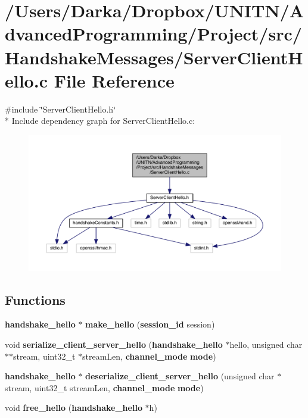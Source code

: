 \section{/\+Users/\+Darka/\+Dropbox/\+U\+N\+I\+T\+N/\+Advanced\+Programming/\+Project/src/\+Handshake\+Messages/\+Server\+Client\+Hello.c File Reference}
\label{_server_client_hello_8c}
{\ttfamily \#include \char`\"{}Server\+Client\+Hello.\+h\char`\"{}}\\*
Include dependency graph for Server\+Client\+Hello.\+c\+:\nopagebreak
\begin{figure}[H]
\begin{center}
\leavevmode
\includegraphics[width=350pt]{_server_client_hello_8c__incl}
\end{center}
\end{figure}
\subsection*{Functions}
\begin{DoxyCompactItemize}
\item 
{\bf handshake\+\_\+hello} $\ast$ {\bf make\+\_\+hello} ({\bf session\+\_\+id} session)
\item 
void {\bf serialize\+\_\+client\+\_\+server\+\_\+hello} ({\bf handshake\+\_\+hello} $\ast$hello, unsigned char $\ast$$\ast$stream, uint32\+\_\+t $\ast$stream\+Len, {\bf channel\+\_\+mode} {\bf mode})
\item 
{\bf handshake\+\_\+hello} $\ast$ {\bf deserialize\+\_\+client\+\_\+server\+\_\+hello} (unsigned char $\ast$stream, uint32\+\_\+t stream\+Len, {\bf channel\+\_\+mode} {\bf mode})
\item 
void {\bf free\+\_\+hello} ({\bf handshake\+\_\+hello} $\ast$h)
\end{DoxyCompactItemize}


